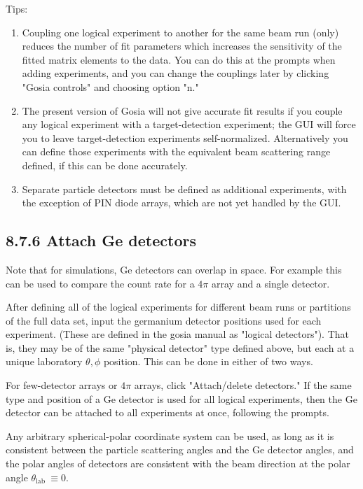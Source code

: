 \documentclass[10pt]{article}
\begin{document}
Tips:

\begin{enumerate}
  \item Coupling one logical experiment to another for the same beam run (only) reduces the number of fit parameters which increases the sensitivity of the fitted matrix elements to the data. You can do this at the prompts when adding experiments, and you can change the couplings later by clicking "Gosia controls" and choosing option "n."
  \item The present version of Gosia will not give accurate fit results if you couple any logical experiment with a target-detection experiment; the GUI will force you to leave target-detection experiments self-normalized. Alternatively you can define those experiments with the equivalent beam scattering range defined, if this can be done accurately.
  \item Separate particle detectors must be defined as additional experiments, with the exception of PIN diode arrays, which are not yet handled by the GUI.
\end{enumerate}

\subsection*{8.7.6 Attach Ge detectors}
Note that for simulations, Ge detectors can overlap in space. For example this can be used to compare the count rate for a $4 \pi$ array and a single detector.

After defining all of the logical experiments for different beam runs or partitions of the full data set, input the germanium detector positions used for each experiment. (These are defined in the gosia manual as "logical detectors"). That is, they may be of the same "physical detector" type defined above, but each at a unique laboratory $\theta, \phi$ position. This can be done in either of two ways.

For few-detector arrays or $4 \pi$ arrays, click "Attach/delete detectors." If the same type and position of a Ge detector is used for all logical experiments, then the Ge detector can be attached to all experiments at once, following the prompts.

Any arbitrary spherical-polar coordinate system can be used, as long as it is consistent between the particle scattering angles and the Ge detector angles, and the polar angles of detectors are consistent with the beam direction at the polar angle $\theta_{\text {lab }} \equiv 0$.
\end{document}
